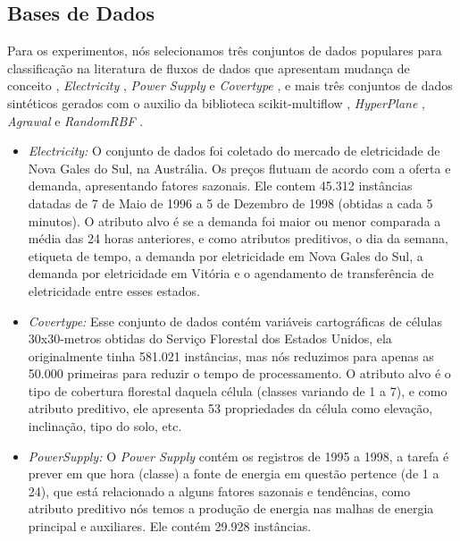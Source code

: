 \subsection{Bases de Dados}
Para os experimentos, nós selecionamos três conjuntos de dados populares para classificação na
literatura de fluxos de dados que apresentam mudança de conceito
\cite{vanrijn2014algorithm,read2012batch}, \textit{Electricity} \cite{gama2004learning},
\textit{Power Supply} \cite{zhu2010stream} e \textit{Covertype} \cite{blackard1998covertype},
e mais três conjuntos de dados sintéticos gerados com o auxilio da biblioteca scikit-multiflow
\cite{skmultiflow}, \textit{HyperPlane} \cite{hulten2001mining}, \textit{Agrawal}
\cite{agrawal1993database} e \textit{RandomRBF} \cite{skmultiflow}.


\begin{itemize}
\item{\textit{Electricity:}} O conjunto de dados foi coletado do mercado de eletricidade de Nova
Gales do Sul, na Austrália. Os preços flutuam de acordo com a oferta e demanda, apresentando
fatores sazonais. Ele contem 45.312 instâncias datadas de 7 de Maio de 1996 a 5 de Dezembro de
1998 (obtidas a cada 5 minutos). O atributo alvo é se a demanda foi maior ou menor comparada a média das 24 horas anteriores, e como atributos preditivos, o dia da semana, etiqueta de tempo, a demanda por eletricidade em Nova Gales do Sul, a demanda por eletricidade em Vitória e o agendamento de transferência de eletricidade entre esses estados.

\item{\textit{Covertype:}} Esse conjunto de dados contém variáveis cartográficas de células
30x30-metros obtidas do Serviço Florestal dos Estados Unidos, ela originalmente tinha 581.021
instâncias, mas nós reduzimos para apenas as 50.000 primeiras para reduzir o tempo de
processamento. O atributo alvo é o tipo de cobertura florestal daquela célula (classes variando
de 1 a 7), e como atributo preditivo, ele apresenta 53 propriedades da célula como elevação, inclinação, tipo do solo, etc.

\item{\textit{PowerSupply:}} O \textit{Power Supply} contém os registros de 1995 a 1998, a tarefa é prever
em que hora (classe) a fonte de energia em questão pertence (de 1 a 24), que está relacionado a
alguns fatores sazonais e tendências, como atributo preditivo nós temos a produção de energia
nas malhas de energia principal e auxiliares. Ele contém 29.928 instâncias.


\end{itemize}
